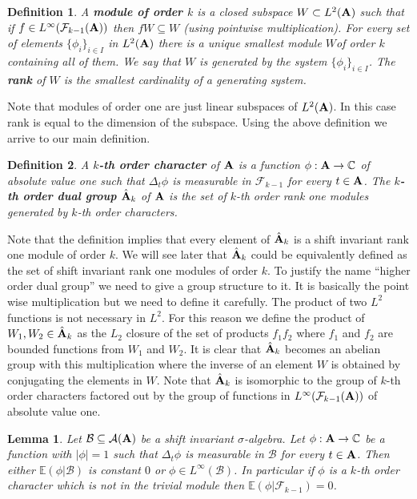 \documentclass [11pt] {article}
\newtheorem{lemma}{Lemma}[section]
\newtheorem{definition}{Definition}[section]
\def\bA{{\bf A}}
\begin{document}
\begin{definition} A {\bf module of order $k$} is a closed subspace $W\subset L^2(\bA)$ such that if $f\in L^\infty(\mathcal{F}_{k-1}(\bA))$ then $fW\subseteq W$ (using pointwise multiplication). For every set of elements $\{\phi_i\}_{i\in I}$ in $L^2(\bA)$ there is a unique smallest module $W$of order $k$ containing all of them. We say that $W$ is generated by the system $\{\phi_i\}_{i\in I}$. The {\bf rank} of $W$ is the smallest cardinality of a generating system.
\end{definition}

Note that modules of order one are just linear subspaces of $L^2(\bA)$. In this case rank is equal to the dimension of the subspace. Using the above definition we arrive to our main definition.

\begin{definition} A {\bf $k$-th order character} of $\bA$ is a function $\phi:\bA\rightarrow\mathbb{C}$ of absolute value one such that $\Delta_t\phi$ is measurable in $\mathcal{F}_{k-1}$ for every $t\in\bA$. The {\bf $k$-th order dual group} $\hat{\bA}_k$ of $\bA$ is the set of $k$-th order rank one modules generated by $k$-th order characters.
\end{definition}

Note that the definition implies that every element of $\hat{\bA}_k$ is a shift invariant rank one module of order $k$. We will see later that $\hat{\bA}_k$ could be equivalently defined as the set of shift invariant rank one modules of order $k$.
To justify the name ``higher order dual group'' we need to give a group structure to it. It is basically the point wise multiplication but we need to define it carefully. The product of two $L^2$ functions is not necessary in $L^2$. For this reason we define the product of $W_1,W_2\in\hat{\bA}_k$ as the $L_2$ closure of the set of products $f_1f_2$ where $f_1$ and $f_2$ are bounded functions from $W_1$ and $W_2$.
It is clear that $\hat{\bA}_k$ becomes an abelian group with this multiplication where the inverse of an element $W$ is obtained by conjugating the elements in $W$. 
Note that $\hat{\bA}_k$ is isomorphic to the group of $k$-th order characters factored out by the group of functions in $L^\infty(\mathcal{F}_{k-1}(\bA))$ of absolute value one.



\begin{lemma}\label{erosort} Let $\mathcal{B}\subseteq\mathcal{A}(\bA)$ be a shift invariant $\sigma$-algebra. Let $\phi:\bA\rightarrow\mathbb{C}$ be a function with $|\phi|=1$ such that $\Delta_t\phi$ is measurable in $\mathcal{B}$ for every $t\in\bA$. Then either $\mathbb{E}(\phi|\mathcal{B})$ is constant $0$ or $\phi\in L^\infty(\mathcal{B})$. In particular if $\phi$ is a $k$-th order character which is not in the trivial module then $\mathbb{E}(\phi|\mathcal{F}_{k-1})=0$.
\end{lemma}
\end{document}
